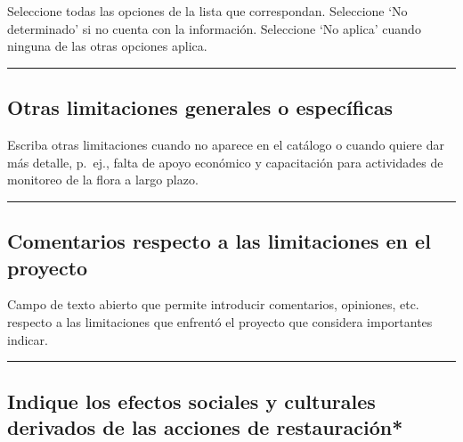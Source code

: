 \documentclass[
]{book}
\begin{document}
Seleccione todas las opciones de la lista que correspondan.
Seleccione `No determinado' si no cuenta con la información.
Seleccione `No aplica' cuando ninguna de las otras opciones aplica.

\begin{center}\rule{0.5\linewidth}{0.5pt}\end{center}

\hypertarget{otras-limitaciones-generales-o-especuxedficas}{%
\subsection*{Otras limitaciones generales o específicas}\label{otras-limitaciones-generales-o-especuxedficas}}

Escriba otras limitaciones cuando no aparece en el catálogo o cuando quiere dar más detalle, p.~ej., falta de apoyo económico y capacitación para actividades de monitoreo de la flora a largo plazo.

\begin{center}\rule{0.5\linewidth}{0.5pt}\end{center}

\hypertarget{comentarios-respecto-a-las-limitaciones-en-el-proyecto}{%
\subsection*{Comentarios respecto a las limitaciones en el proyecto}\label{comentarios-respecto-a-las-limitaciones-en-el-proyecto}}

Campo de texto abierto que permite introducir comentarios, opiniones, etc. respecto a las limitaciones que enfrentó el proyecto que considera importantes indicar.

\begin{center}\rule{0.5\linewidth}{0.5pt}\end{center}

\hypertarget{indique-los-efectos-sociales-y-culturales-derivados-de-las-acciones-de-restauraciuxf3n}{%
\subsection*{\texorpdfstring{{Indique los efectos sociales y culturales derivados de las acciones de restauración*}}{Indique los efectos sociales y culturales derivados de las acciones de restauración*}}\label{indique-los-efectos-sociales-y-culturales-derivados-de-las-acciones-de-restauraciuxf3n}}
\end{document}
